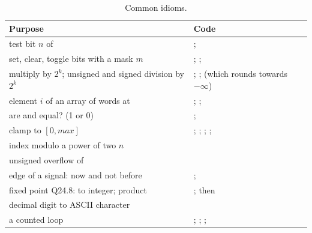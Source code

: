 \begin{table}[htb]
\centering\small
\caption{Common idioms.}\label{tab:rv:idioms}
\begin{tabularx}{\textwidth}{@{}LP{0.47\textwidth}@{}}
\toprule
\textbf{Purpose} & \textbf{Code}\\
\midrule
test bit $n$ of  &  ; \\
set, clear, toggle bits with a mask $m$ &  ;  ; \\
multiply by $2^{k}$; unsigned and signed division by $2^{k}$ &  ;  ;  (which rounds towards $-\infty$)\\
element $i$ of an array of words at  &  ;  ; \\
are  and  equal? (1 or 0) &  ; \\
clamp  to $[0, max]$ &  ;  ;  ;  ; \\
index modulo a power of two $n$ & \\
unsigned overflow of  & \\
edge of a signal: now and not before &  ; \\
fixed point Q24.8: to integer; product &  ;  then \\
decimal digit to ASCII character & \\
a counted loop &  ;  ;  ; \\
\bottomrule
\end{tabularx}
\end{table}
